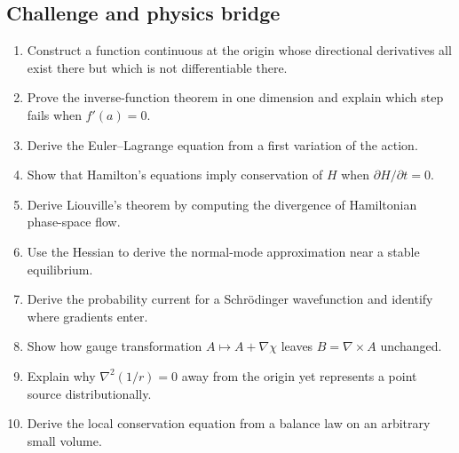 \subsection{Challenge and physics bridge}
\begin{enumerate}
  \item Construct a function continuous at the origin whose directional derivatives all exist there but which is not differentiable there.
  \item Prove the inverse-function theorem in one dimension and explain which step fails when $f'(a)=0$.
  \item Derive the Euler--Lagrange equation from a first variation of the action.
  \item Show that Hamilton's equations imply conservation of $H$ when $\partial H/\partial t=0$.
  \item Derive Liouville's theorem by computing the divergence of Hamiltonian phase-space flow.
  \item Use the Hessian to derive the normal-mode approximation near a stable equilibrium.
  \item Derive the probability current for a Schrödinger wavefunction and identify where gradients enter.
  \item Show how gauge transformation $A\mapsto A+\nabla\chi$ leaves $B=\nabla\times A$ unchanged.
  \item Explain why $\nabla^2(1/r)=0$ away from the origin yet represents a point source distributionally.
  \item Derive the local conservation equation from a balance law on an arbitrary small volume.
\end{enumerate}

